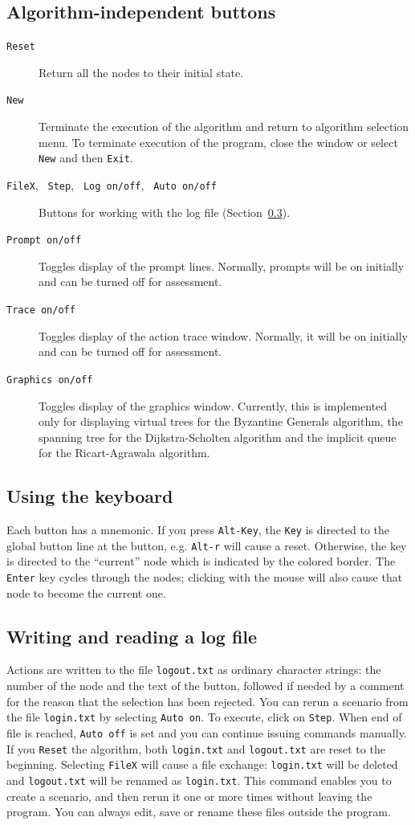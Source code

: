 \documentclass[11pt]{article}
\newcommand{\p}[1]{\texttt{#1}}
\begin{document}
\subsection{Algorithm-independent buttons}
\begin{description}
\item[\p{Reset}] Return all the nodes to their initial state.
\item[\p{New}] Terminate the execution of the algorithm and return
to algorithm selection menu. To terminate execution of the program,
close the window or select \p{New} and then \p{Exit}.
\item [\p{FileX}, \p{ Step}, \p{ Log on/off}, \p{ Auto on/off}]
Buttons for working with the log file (Section~\ref{s.log}).
\item[\p{Prompt on/off}] Toggles display of the prompt lines.
Normally, prompts will be on initially and can be turned off for assessment.
\item[\p{Trace on/off}] Toggles display of the action trace window.
Normally, it will be on initially and can be turned off for assessment.
\item[\p{Graphics on/off}] Toggles display of the graphics window.
Currently, this is implemented only for displaying virtual trees for the
Byzantine Generals algorithm, the spanning tree for the Dijkstra-Scholten
algorithm and the implicit queue for the Ricart-Agrawala algorithm.
\end{description}

\subsection{Using the keyboard}
Each button has a mnemonic. If you press \p{Alt-Key},
the \p{Key} is directed to the global button line at the button, e.g.
\p{Alt-r} will cause a reset.
Otherwise, the key is directed to the ``current'' node
which is indicated by the colored border. The \p{Enter} key cycles
through the nodes; clicking with the mouse will also cause that node to
become the current one.

\subsection{Writing and reading a log file}\label{s.log}
Actions are written to the file \p{logout.txt} as ordinary character strings:
the number of the node and the text of the button,
followed if needed by a comment for the reason that
the selection has been rejected.
You can rerun a scenario from the file \p{login.txt} by selecting \p{Auto on}.
To execute, click on \p{Step}.
When end of file is reached, \p{Auto off} is set and you can continue issuing commands manually.
If you \p{Reset} the algorithm, both \p{login.txt} and \p{logout.txt} are reset
to the beginning.
Selecting \p{FileX} will cause a file exchange:
\p{login.txt} will be deleted and \p{logout.txt} will be renamed as \p{login.txt}.
This command enables you to create a scenario, and then rerun it one or more times without
leaving the program.
You can always edit, save or rename these files outside the program.
\end{document}
